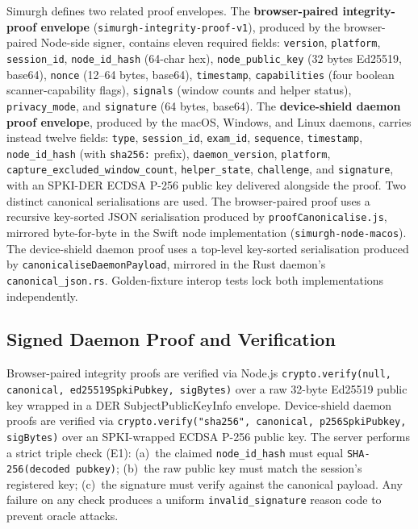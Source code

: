 \documentclass[conference]{IEEEtran}
\begin{document}
Simurgh defines two related proof envelopes. The \textbf{browser-paired integrity-proof envelope} (\texttt{simurgh-integrity-proof-v1}), produced by the browser-paired Node-side signer, contains eleven required fields: \texttt{version}, \texttt{platform}, \texttt{session\_id}, \texttt{node\_id\_hash} (64-char hex), \texttt{node\_public\_key} (32 bytes Ed25519, base64), \texttt{nonce} (12--64 bytes, base64), \texttt{timestamp}, \texttt{capabilities} (four boolean scanner-capability flags), \texttt{signals} (window counts and helper status), \texttt{privacy\_mode}, and \texttt{signature} (64 bytes, base64). The \textbf{device-shield daemon proof envelope}, produced by the macOS, Windows, and Linux daemons, carries instead twelve fields: \texttt{type}, \texttt{session\_id}, \texttt{exam\_id}, \texttt{sequence}, \texttt{timestamp}, \texttt{node\_id\_hash} (with \texttt{sha256:} prefix), \texttt{daemon\_version}, \texttt{platform}, \texttt{capture\_excluded\_window\_count}, \texttt{helper\_state}, \texttt{challenge}, and \texttt{signature}, with an SPKI-DER ECDSA P-256 public key delivered alongside the proof. Two distinct canonical serialisations are used. The browser-paired proof uses a recursive key-sorted JSON serialisation produced by \texttt{proofCanonicalise.js}, mirrored byte-for-byte in the Swift node implementation (\texttt{simurgh-node-macos}). The device-shield daemon proof uses a top-level key-sorted serialisation produced by \texttt{canonicaliseDaemonPayload}, mirrored in the Rust daemon's \texttt{canonical\_json.rs}. Golden-fixture interop tests lock both implementations independently.

\subsection{Signed Daemon Proof and Verification}

Browser-paired integrity proofs are verified via Node.js \texttt{crypto.verify(null, canonical, ed25519SpkiPubkey, sigBytes)} over a raw 32-byte Ed25519 public key wrapped in a DER SubjectPublicKeyInfo envelope. Device-shield daemon proofs are verified via \texttt{crypto.verify("sha256", canonical, p256SpkiPubkey, sigBytes)} over an SPKI-wrapped ECDSA P-256 public key. The server performs a strict triple check (E1): (a)~the claimed \texttt{node\_id\_hash} must equal \texttt{SHA-256(decoded~pubkey)}; (b)~the raw public key must match the session's registered key; (c)~the signature must verify against the canonical payload. Any failure on any check produces a uniform \texttt{invalid\_signature} reason code to prevent oracle attacks.
\end{document}
